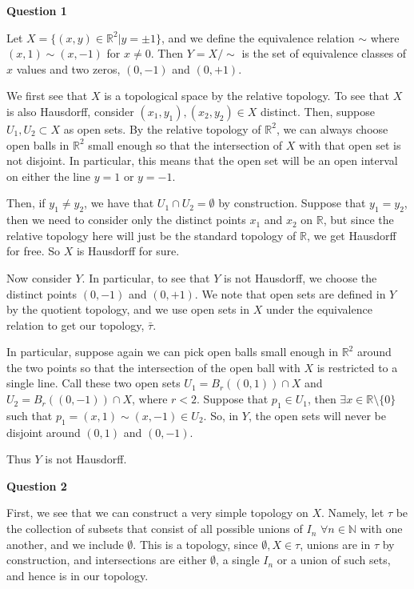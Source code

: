 \documentclass[10pt]{article}
\newcommand{\R}{\mathbb{R}}
\newcommand{\N}{\mathbb{N}}
\begin{document}
\textbf{Question 1}

Let $X = \{(x,y)\in\R^{2} | y=\pm 1\}$, and we define the equivalence relation $\sim$ where $(x,1) \sim (x,-1)$ for $x \neq 0$. Then $Y = X/\sim$ is the set of equivalence classes of $x$ values and two zeros, $(0,-1)$ and $(0,+1)$. 

We first see that $X$ is a topological space by the relative topology. To see that $X$ is also Hausdorff, consider $(x_{1},y_{1}), (x_{2},y_{2}) \in X$ distinct. Then, suppose $U_{1}, U_{2} \subset X$ as open sets. By the relative topology of $\R^{2}$, we can always choose open balls in $\R^{2}$ small enough so that the intersection of $X$ with that open set is not disjoint. In particular, this means that the open set will be an open interval on either the line $y=1$ or $y=-1$.

Then, if $y_{1} \neq y_{2}$, we have that $U_{1}\cap U_{2} = \emptyset$ by construction. Suppose that $y_{1} = y_{2}$, then we need to consider only the distinct points $x_{1}$ and $x_{2}$ on $\R$, but since the relative topology here will just be the standard topology of $\R$, we get Hausdorff for free. So $X$ is Hausdorff for sure.

Now consider $Y$. In particular, to see that $Y$ is not Hausdorff, we choose the distinct points $(0,-1)$ and $(0,+1)$. We note that open sets are defined in $Y$ by the quotient topology, and we use open sets in $X$ under the equivalence relation to get our topology, $\bar{\tau}$.

In particular, suppose again we can pick open balls small enough in $\R^{2}$ around the two points so that the intersection of the open ball with $X$ is restricted to a single line. Call these two open sets $U_{1} = B_{r}((0,1))\cap X$ and $U_{2} = B_{r}((0,-1))\cap X$, where $r < 2$. Suppose that $p_{1} \in U_{1}$, then $\exists x \in \R\setminus \{0\}$ such that $p_{1} = (x,1) \sim (x,-1) \in U_{2}$. So, in $Y$, the open sets will never be disjoint around $(0,1)$ and $(0,-1)$.

Thus $Y$ is not Hausdorff.


\newpage

\textbf{Question 2}

First, we see that we can construct a very simple topology on $X$. Namely, let $\tau$ be the collection of subsets that consist of all possible unions of $I_{n}$ $\forall n \in \N$ with one another, and we include $\emptyset$. This is a topology, since $\emptyset, X\in \tau$, unions are in $\tau$ by construction, and intersections are either $\emptyset$, a single $I_{n}$ or a union of such sets, and hence is in our topology.
\end{document}
